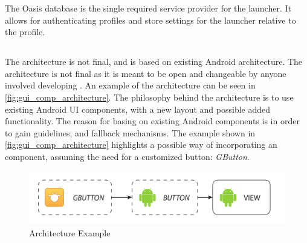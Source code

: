 The Oasis database is the single required service provider for the launcher.
It allows for authenticating profiles and store settings for the launcher relative to the profile.

\subsection{\guicomponents[]}
The \guicomponents[] architecture is not final, and is based on existing Android architecture. The architecture is not final as it is meant to be open and changeable by anyone involved developing \giraf[]. An example of the architecture can be seen in \autoref{fig:gui_comp_architecture}.
The philosophy behind the architecture is to use existing Android UI components, with a new layout and possible added functionality.
The reason for basing on existing Android components is in order to gain guidelines, and fallback mechanisms.
The example shown in \autoref{fig:gui_comp_architecture} highlights a possible way of incorporating an component, assuming the need for a customized button: \textit{GButton}. 
\begin{figure}[h]
	\centering
	\includegraphics[width=1\textwidth]{gfx/gui_components_architecture.pdf}
	\caption{\guicomponents[] Architecture Example}
	\label{fig:gui_comp_architecture}
\end{figure}

